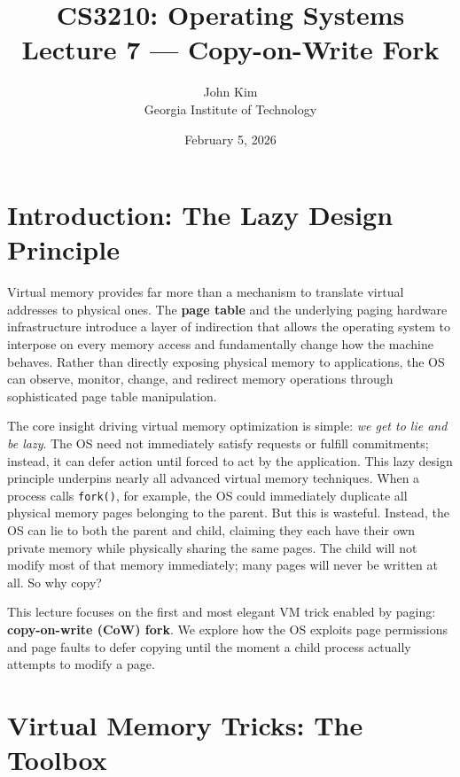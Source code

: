 \documentclass[11pt]{article}
\title{\textbf{CS3210: Operating Systems} \\ Lecture 7 --- Copy-on-Write Fork}
\author{John Kim \\ Georgia Institute of Technology}
\date{February 5, 2026}
\begin{document}
\maketitle
\tableofcontents
\newpage

\section{Introduction: The Lazy Design Principle}

Virtual memory provides far more than a mechanism to translate virtual addresses to physical ones. The \textbf{page table} and the underlying paging hardware infrastructure introduce a layer of indirection that allows the operating system to interpose on every memory access and fundamentally change how the machine behaves. Rather than directly exposing physical memory to applications, the OS can observe, monitor, change, and redirect memory operations through sophisticated page table manipulation.

The core insight driving virtual memory optimization is simple: \emph{we get to lie and be lazy}. The OS need not immediately satisfy requests or fulfill commitments; instead, it can defer action until forced to act by the application. This lazy design principle underpins nearly all advanced virtual memory techniques. When a process calls \texttt{fork()}, for example, the OS could immediately duplicate all physical memory pages belonging to the parent. But this is wasteful. Instead, the OS can lie to both the parent and child, claiming they each have their own private memory while physically sharing the same pages. The child will not modify most of that memory immediately; many pages will never be written at all. So why copy?

This lecture focuses on the first and most elegant VM trick enabled by paging: \textbf{copy-on-write (CoW) fork}. We explore how the OS exploits page permissions and page faults to defer copying until the moment a child process actually attempts to modify a page.

\section{Virtual Memory Tricks: The Toolbox}
\end{document}
